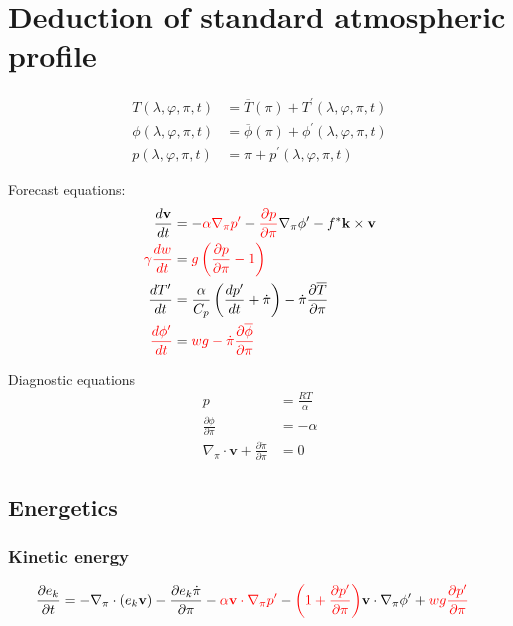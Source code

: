 \documentclass[12pt]{article}
\renewcommand{\d}[2]{\frac{d #1}{d #2}}
\newcommand{\dt}[1]{\d{#1}{t}}
\newcommand{\pd}[2]{\frac{\partial #1}{\partial #2}}
\newcommand{\pdt}[1]{\pd{#1}{t}}
\newcommand{\pdz}[1]{\pd{#1}{\pi}}
\renewcommand{\vec}[1]{\mathbf{#1}}
\newcommand{\x}{\lambda}
\newcommand{\y}{\varphi}
\newcommand{\grad}[2][\pi]{\nabla_{#1} #2}
\begin{document}
\section{Deduction of standard atmospheric profile}

\begin{align*}
      T\left(\x, \y, \pi, t\right) & = \overline{T}   \left(\pi\right) +    T^\prime\left(\x, \y, \pi, t\right) \\
   \phi\left(\x, \y, \pi, t\right) & = \overline{\phi}\left(\pi\right) + \phi^\prime\left(\x, \y, \pi, t\right) \\
      p\left(\x, \y, \pi, t\right) & =             \pi                 +    p^\prime\left(\x, \y, \pi, t\right)
\end{align*}

Forecast equations:
\begin{align*}
  \dt{\vec{v}} & = - {\color{red}\alpha \grad{p^\prime}} - {\color{red}\pd{p}{\pi}} \grad{\phi^\prime} - f^* \vec{k} \times \vec{v} \\
  {\color{red}\gamma \dt{w}} & = {\color{red}g \left(\pd{p}{\pi} - 1\right)} \\
  \dt{T^\prime} & = \frac{\alpha}{C_p} \left(\dt{p^\prime} + \dot{\pi}\right) - \dot{\pi} \pdz{\overline{T}} \\
  {\color{red}\dt{\phi^\prime}} & = {\color{red}w g - \dot{\pi} \pdz{\overline{\phi}}}
\end{align*}

Diagnostic equations
\begin{align*}
  p & = \frac{R T}{\alpha} \\
  \pd{\phi}{\pi} & = - \alpha \\
  \nabla_\pi \cdot \vec{v} + \pd{\dot{\pi}}{\pi} & = 0
\end{align*}

\subsection{Energetics}

\subsubsection{Kinetic energy}

\begin{align*}
  \pdt{e_k} & = - \nabla_\pi \cdot \left(e_k \vec{v}\right) - \pdz{e_k \dot{\pi}} - {\color{red}\alpha \vec{v} \cdot \nabla_\pi p^\prime} - {\color{red}\left(1 + \pd{p^\prime}{\pi}\right)} \vec{v} \cdot \nabla_\pi \phi^\prime + {\color{red}w g \pd{p^\prime}{\pi}}
\end{align*}
\end{document}
